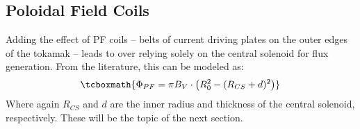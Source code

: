 \subsection{ Poloidal Field Coils}

Adding the effect of PF coils -- belts of current driving plates on the outer edges of the tokamak -- leads to  over relying solely on the central solenoid for flux generation. From the literature, this can be modeled as: \cite{hartmann}
\begin{equation}
	\label{eq:phipf}
	\tcboxmath{
	\Phi_{PF} = \pi B_V \cdot \left( R_0^2 - ( R_{CS} + d ) ^ 2 \right)
	}
\end{equation}
Where again $R_{CS}$ and $d$ are the inner radius and thickness of the central solenoid, respectively. These will be the topic of the next section.

